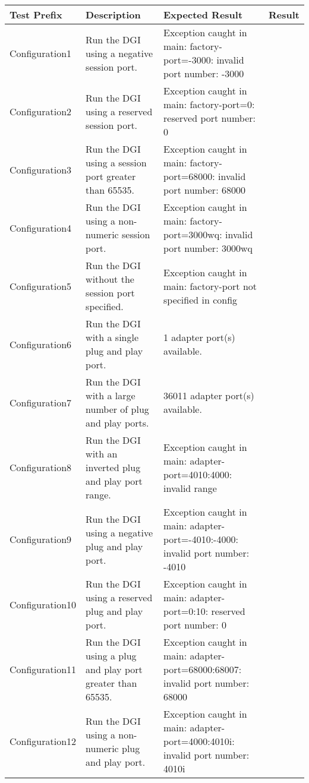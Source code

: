 \documentclass{article}
\begin{document}
%
\begin{center}
\begin{footnotesize}
\begin{longtable}{|p{3cm}|p{4cm}|p{10cm}|c|}
    \hline
    Test Prefix & Description & Expected Result & Result \\ \hline \endhead \hline \endfoot
    Configuration1 & Run the DGI using a negative session port. & Exception caught in main: factory-port=-3000: invalid port number: -3000 & \\
    Configuration2 & Run the DGI using a reserved session port. & Exception caught in main: factory-port=0: reserved port number: 0 & \\
    Configuration3 & Run the DGI using a session port greater than 65535. & Exception caught in main: factory-port=68000: invalid port number: 68000 & \\
    Configuration4 & Run the DGI using a non-numeric session port. & Exception caught in main: factory-port=3000wq: invalid port number: 3000wq & \\
    Configuration5 & Run the DGI without the session port specified. & Exception caught in main: factory-port not specified in config & \\
    Configuration6 & Run the DGI with a single plug and play port. & 1 adapter port(s) available. & \\
    Configuration7 & Run the DGI with a large number of plug and play ports. & 36011 adapter port(s) available. & \\
    Configuration8 & Run the DGI with an inverted plug and play port range. & Exception caught in main: adapter-port=4010:4000: invalid range & \\
    Configuration9 & Run the DGI using a negative plug and play port. & Exception caught in main: adapter-port=-4010:-4000: invalid port number: -4010 & \\
    Configuration10 & Run the DGI using a reserved plug and play port. & Exception caught in main: adapter-port=0:10: reserved port number: 0 & \\
    Configuration11 & Run the DGI using a plug and play port greater than 65535. & Exception caught in main: adapter-port=68000:68007: invalid port number: 68000 & \\
    Configuration12 & Run the DGI using a non-numeric plug and play port. & Exception caught in main: adapter-port=4000:4010i: invalid port number: 4010i & \\

\end{longtable}
\end{footnotesize}
\end{center}
\end{document}
